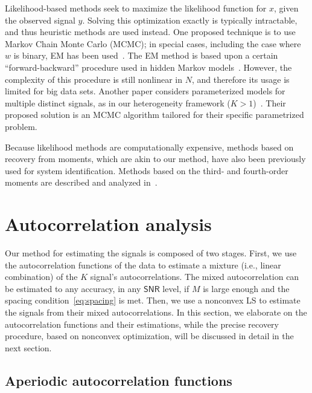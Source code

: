 \documentclass[english,11pt]{article}
\numberwithin{equation}{section}
\theoremstyle{plain}
\theoremstyle{definition}
\theoremstyle{remark}
\theoremstyle{plain}
\theoremstyle{remark}
\theoremstyle{plain}
\theoremstyle{plain}
\newcommand{\SNR}{{\textsf{SNR}}}
\begin{document}
Likelihood-based methods seek to maximize the likelihood function for $x$,
given the observed signal $y$. Solving this optimization exactly is typically
intractable, and thus heuristic methods are used instead. One proposed technique is to use Markov Chain Monte Carlo (MCMC); in special
cases, including the case where $w$ is binary, EM has been used~\cite{cappe1999simulation}.
The EM method is based upon a certain ``forward-backward'' procedure
used in hidden Markov models~\cite{rabiner1989tutorial}. 
However, the complexity of this procedure is still nonlinear in $N$, and therefore its usage is limited for big data sets.   
Another paper considers parameterized models for multiple distinct signals, as in our heterogeneity framework ($K>1$)~\cite{andrieu2001bayesian}.
Their proposed solution is an MCMC algorithm tailored for their specific parametrized problem.

Because likelihood methods are computationally expensive, methods based
on recovery from moments, which are akin to our method, have
also been previously used for system identification. 
Methods based on the third- and fourth-order moments are described and analyzed in~\cite{lii1982deconvolution,giannakis1989identification,tugnait1984identification}.


\section{Autocorrelation analysis}   \label{sec:autocorrelation}

Our method for estimating the signals is composed of two stages. 
First, we use the autocorrelation functions of the data to estimate a mixture (i.e., linear combination) of the $K$ signal's autocorrelations. The mixed autocorrelation can be estimated to any accuracy, in any $\SNR$ level, if $M$ is large enough and the spacing condition~\eqref{eq:spacing} is met. Then, we  use a nonconvex LS  to estimate the signals from their mixed autocorrelations. 
In this section, we elaborate on the autocorrelation functions and their estimations, while the precise recovery procedure, based on nonconvex optimization, will be discussed in detail in the next section.


\subsection{Aperiodic autocorrelation functions} \label{sec:aperiodic_ac}
\end{document}
